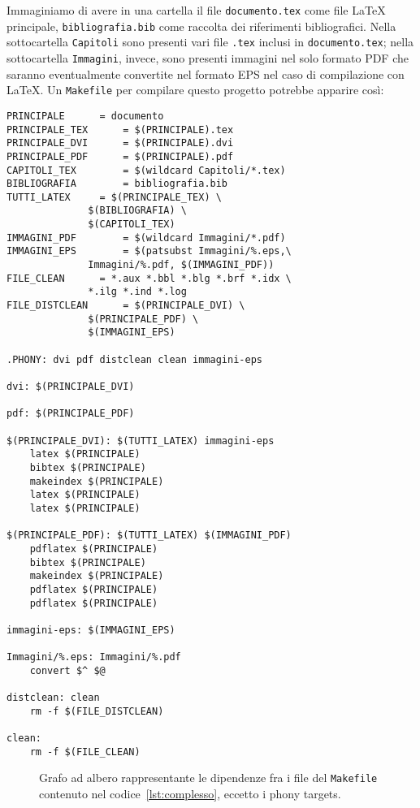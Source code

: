 Immaginiamo di avere in una cartella il file \texttt{documento.tex} come file
\LaTeX{}
principale, \texttt{bibliografia.bib} come raccolta dei riferimenti
bibliografici.  Nella sottocartella \texttt{Capitoli} sono presenti vari file
\texttt{.tex} inclusi in \texttt{documento.tex}; nella sottocartella
\texttt{Immagini}, invece, sono presenti immagini nel solo formato \textsc{PDF}
che saranno eventualmente convertite nel formato \textsc{EPS} nel caso di
compilazione con \LaTeX.  Un \texttt{Makefile} per compilare questo progetto
potrebbe apparire così:
\begin{lstlisting}[caption={Un \texttt{Makefile} complesso.},
label=lst:complesso]
PRINCIPALE 		= documento
PRINCIPALE_TEX		= $(PRINCIPALE).tex
PRINCIPALE_DVI		= $(PRINCIPALE).dvi
PRINCIPALE_PDF		= $(PRINCIPALE).pdf
CAPITOLI_TEX		= $(wildcard Capitoli/*.tex)
BIBLIOGRAFIA		= bibliografia.bib
TUTTI_LATEX		= $(PRINCIPALE_TEX) \
			  $(BIBLIOGRAFIA) \
			  $(CAPITOLI_TEX)
IMMAGINI_PDF		= $(wildcard Immagini/*.pdf)
IMMAGINI_EPS		= $(patsubst Immagini/%.eps,\
			  Immagini/%.pdf, $(IMMAGINI_PDF))
FILE_CLEAN		= *.aux *.bbl *.blg *.brf *.idx \
			  *.ilg *.ind *.log
FILE_DISTCLEAN		= $(PRINCIPALE_DVI) \
			  $(PRINCIPALE_PDF) \
			  $(IMMAGINI_EPS)

.PHONY: dvi pdf distclean clean immagini-eps

dvi: $(PRINCIPALE_DVI)

pdf: $(PRINCIPALE_PDF)

$(PRINCIPALE_DVI): $(TUTTI_LATEX) immagini-eps
	latex $(PRINCIPALE)
	bibtex $(PRINCIPALE)
	makeindex $(PRINCIPALE)
	latex $(PRINCIPALE)
	latex $(PRINCIPALE)

$(PRINCIPALE_PDF): $(TUTTI_LATEX) $(IMMAGINI_PDF)
	pdflatex $(PRINCIPALE)
	bibtex $(PRINCIPALE)
	makeindex $(PRINCIPALE)
	pdflatex $(PRINCIPALE)
	pdflatex $(PRINCIPALE)

immagini-eps: $(IMMAGINI_EPS)

Immagini/%.eps: Immagini/%.pdf
	convert $^ $@

distclean: clean
	rm -f $(FILE_DISTCLEAN)

clean:
	rm -f $(FILE_CLEAN)
\end{lstlisting}
\begin{figure}
  \centering
  \caption{Grafo ad albero rappresentante le dipendenze fra i file del
    \texttt{Makefile} contenuto nel codice~\ref{lst:complesso}, eccetto i phony
    targets.}
  \label{fig:grafo-albero2}
\end{figure}
